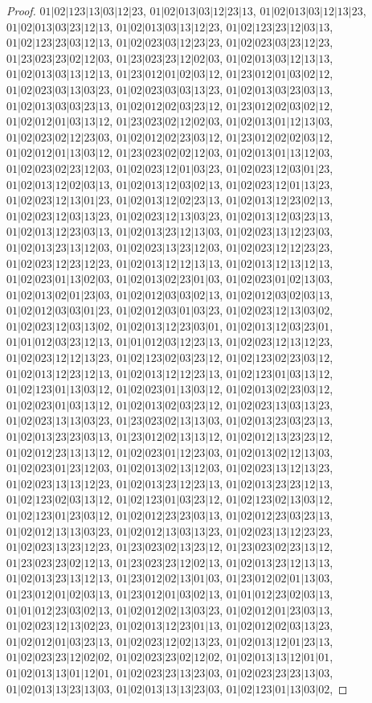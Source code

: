 \documentclass[12pt]{article}
\theoremstyle{plain}
\theoremstyle{definition}
\theoremstyle{remark}
\begin{document}
\begin{proof}
$01|02|123|13|03|12|23$, $01|02|013|03|12|23|13$, $01|02|013|03|12|13|23$, $01|02|013|03|23|12|13$, $01|02|013|03|13|12|23$, $01|02|123|23|12|03|13$, $01|02|123|23|03|12|13$, $01|02|023|03|12|23|23$, $01|02|023|03|23|12|23$, $01|23|023|23|02|12|03$, $01|23|023|23|12|02|03$, $01|02|013|03|12|13|13$, $01|02|013|03|13|12|13$, $01|23|012|01|02|03|12$, $01|23|012|01|03|02|12$, $01|02|023|03|13|03|23$, $01|02|023|03|03|13|23$, $01|02|013|03|23|03|13$, $01|02|013|03|03|23|13$, $01|02|012|02|03|23|12$, $01|23|012|02|03|02|12$, $01|02|012|01|03|13|12$, $01|23|023|02|12|02|03$, $01|02|013|01|12|13|03$, $01|02|023|02|12|23|03$, $01|02|012|02|23|03|12$, $01|23|012|02|02|03|12$, $01|02|012|01|13|03|12$, $01|23|023|02|02|12|03$, $01|02|013|01|13|12|03$, $01|02|023|02|23|12|03$, $01|02|023|12|01|03|23$, $01|02|023|12|03|01|23$, $01|02|013|12|02|03|13$, $01|02|013|12|03|02|13$, $01|02|023|12|01|13|23$, $01|02|023|12|13|01|23$, $01|02|013|12|02|23|13$, $01|02|013|12|23|02|13$, $01|02|023|12|03|13|23$, $01|02|023|12|13|03|23$, $01|02|013|12|03|23|13$, $01|02|013|12|23|03|13$, $01|02|013|23|12|13|03$, $01|02|023|13|12|23|03$, $01|02|013|23|13|12|03$, $01|02|023|13|23|12|03$, $01|02|023|12|12|23|23$, $01|02|023|12|23|12|23$, $01|02|013|12|12|13|13$, $01|02|013|12|13|12|13$, $01|02|023|01|13|02|03$, $01|02|013|02|23|01|03$, $01|02|023|01|02|13|03$, $01|02|013|02|01|23|03$, $01|02|012|03|03|02|13$, $01|02|012|03|02|03|13$, $01|02|012|03|03|01|23$, $01|02|012|03|01|03|23$, $01|02|023|12|13|03|02$, $01|02|023|12|03|13|02$, $01|02|013|12|23|03|01$, $01|02|013|12|03|23|01$, $01|01|012|03|23|12|13$, $01|01|012|03|12|23|13$, $01|02|023|12|13|12|23$, $01|02|023|12|12|13|23$, $01|02|123|02|03|23|12$, $01|02|123|02|23|03|12$, $01|02|013|12|23|12|13$, $01|02|013|12|12|23|13$, $01|02|123|01|03|13|12$, $01|02|123|01|13|03|12$, $01|02|023|01|13|03|12$, $01|02|013|02|23|03|12$, $01|02|023|01|03|13|12$, $01|02|013|02|03|23|12$, $01|02|023|13|03|13|23$, $01|02|023|13|13|03|23$, $01|23|023|02|13|13|03$, $01|02|013|23|03|23|13$, $01|02|013|23|23|03|13$, $01|23|012|02|13|13|12$, $01|02|012|13|23|23|12$, $01|02|012|23|13|13|12$, $01|02|023|01|12|23|03$, $01|02|013|02|12|13|03$, $01|02|023|01|23|12|03$, $01|02|013|02|13|12|03$, $01|02|023|13|12|13|23$, $01|02|023|13|13|12|23$, $01|02|013|23|12|23|13$, $01|02|013|23|23|12|13$, $01|02|123|02|03|13|12$, $01|02|123|01|03|23|12$, $01|02|123|02|13|03|12$, $01|02|123|01|23|03|12$, $01|02|012|23|23|03|13$, $01|02|012|23|03|23|13$, $01|02|012|13|13|03|23$, $01|02|012|13|03|13|23$, $01|02|023|13|12|23|23$, $01|02|023|13|23|12|23$, $01|23|023|02|13|23|12$, $01|23|023|02|23|13|12$, $01|23|023|23|02|12|13$, $01|23|023|23|12|02|13$, $01|02|013|23|12|13|13$, $01|02|013|23|13|12|13$, $01|23|012|02|13|01|03$, $01|23|012|02|01|13|03$, $01|23|012|01|02|03|13$, $01|23|012|01|03|02|13$, $01|01|012|23|02|03|13$, $01|01|012|23|03|02|13$, $01|02|012|02|13|03|23$, $01|02|012|01|23|03|13$, $01|02|023|12|13|02|23$, $01|02|013|12|23|01|13$, $01|02|012|02|03|13|23$, $01|02|012|01|03|23|13$, $01|02|023|12|02|13|23$, $01|02|013|12|01|23|13$, $01|02|023|23|12|02|02$, $01|02|023|23|02|12|02$, $01|02|013|13|12|01|01$, $01|02|013|13|01|12|01$, $01|02|023|23|13|23|03$, $01|02|023|23|23|13|03$, $01|02|013|13|23|13|03$, $01|02|013|13|13|23|03$, $01|02|123|01|13|03|02$, 
\end{proof}
\end{document}
